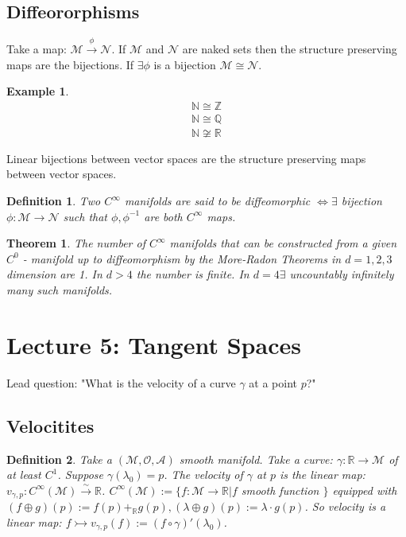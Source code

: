 \documentclass[10pt, oneside]{article}
\newcommand{\R}{\mathbb{R}}
\newcommand{\Z}{\mathbb{Z}}
\newcommand{\N}{\mathbb{N}}
\newcommand{\Q}{\mathbb{Q}}
\newcommand{\M}{\mathcal{M}}
\newtheorem{thm}{Theorem}
\newtheorem{defn}{Definition}
\newtheorem{example}{Example}
\begin{document}
  \subsection*{Diffeororphisms}
     Take a map: $\M \xrightarrow{\phi} \mathcal{N}$. If $\M$ and $\mathcal{N}$ are naked sets then the structure preserving maps are the bijections. If $\exists \phi$ is a bijection $\M \cong \mathcal{N}$.
     \begin{example}
     \begin{align*}
        \N \cong \Z \\
        \N \cong \Q \\
        \N \not \cong \R
     \end{align*}
     \end{example}
     Linear bijections between vector spaces are the structure preserving maps between vector spaces.
     \begin{defn}
        Two $C^\infty$ manifolds are said to be diffeomorphic $\iff \exists$ bijection $\phi: \M \to \mathcal{N}$ such that $\phi, \phi^{-1}$ are both $C^\infty$ maps.
     \end{defn}
     \begin{thm}
        The number of $C^\infty$ manifolds that can be constructed from a given $C^0$ - manifold up to diffeomorphism by the More-Radon Theorems in $d = 1,2,3$ dimension are 1. In $d > 4$ the number is finite. In $d=4 \exists$ uncountably infinitely many such manifolds.
     \end{thm}
\section*{Lecture 5: Tangent Spaces}
     Lead question: "What is the velocity of a curve $\gamma$ at a point $p$?"
  \subsection*{Velocitites}
     \begin{defn}
        Take a $(\M,\mathcal{O}, \mathcal{A})$ smooth manifold. Take a curve: $\gamma: \R \to \M$ of at least $C^1$. Suppose $\gamma(\lambda_0) = p$.
        The velocity of $\gamma$ at $p$ is the linear map: $v_{\gamma,p}: C^{\infty}(\M) \xrightarrow{\sim} \R$. $C^\infty (\M) := \{f:\M \to \R | f $ smooth function $\}$ equipped with $(f \oplus g)(p) := f(p) +_{\R} g(p), (\lambda \oplus g)(p):=\lambda \cdot g(p)$.
        So velocity is a linear map: $f \rightarrowtail v_{\gamma,p} (f) := (f \circ \gamma)'(\lambda_0)$.
     \end{defn}
\end{document}
